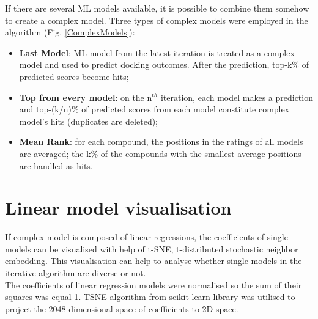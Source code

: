 If there are several ML models available, it is possible to combine them somehow 
to create a complex model.
Three types of complex models were employed in the algorithm (Fig. \ref{ComplexModels}):
\begin{itemize}
    \item \textbf{Last Model}: ML model from the latest iteration is treated as a complex model and used to predict docking outcomes.
    After the prediction, top-k\% of predicted scores become hits;
    \item \textbf{Top from every model}: on the $\text{n}^{th}$ iteration, each model makes a prediction and top-(k/n)\% of predicted scores from each model constitute complex model's hits (duplicates are deleted);
    \item \textbf{Mean Rank}: for each compound, the positions in the ratings of all models are averaged; the k\% of the compounds with the smallest average positions are handled as hits.
\end{itemize}


\section{Linear model visualisation}
If complex model is composed of linear regressions, the coefficients of single models 
can be visualised with help of t-SNE, t-distributed stochastic neighbor embedding.
This visualisation can help to analyse whether single models in the iterative algorithm 
are diverse or not. \\

The coefficients of linear regression models were normalised so the sum of their 
squares was equal 1.
TSNE algorithm from scikit-learn library was utilised to project the 2048-dimensional 
space of coefficients to 2D space. 

